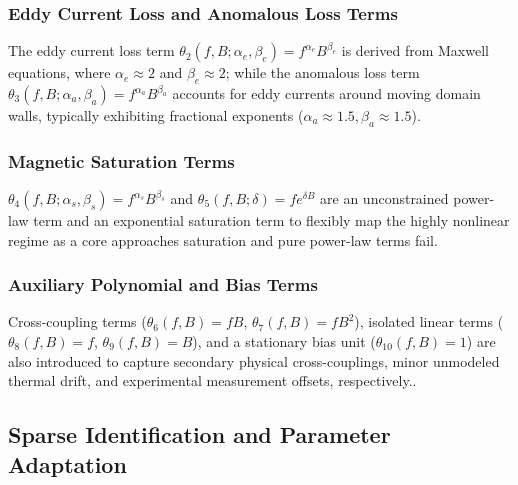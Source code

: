 \documentclass[lettersize,journal]{IEEEtran}
\begin{document}
\subsubsection{Eddy Current Loss and Anomalous Loss Terms}
The eddy current loss term $\theta_2 (f, B; \alpha_e, \beta_e) = f^{\alpha_e} B^{\beta_e}$ is derived from Maxwell equations, where $\alpha_e \approx 2$ and $\beta_e \approx 2$; while the anomalous loss term $\theta_3 (f, B; \alpha_a, \beta_a) = f^{\alpha_a} B^{\beta_a}$ accounts for eddy currents around moving domain walls, typically exhibiting fractional exponents ($\alpha_a \approx 1.5, \beta_a \approx 1.5$).

\subsubsection{Magnetic Saturation Terms}
$\theta_4 (f, B; \alpha_s, \beta_s) = f^{\alpha_s} B^{\beta_s}$ and $ \theta_5 (f, B; \delta)= f e^{\delta B}$ are an unconstrained power-law term and an exponential saturation term to flexibly map the highly nonlinear regime as a core approaches saturation and pure power-law terms fail. 

\subsubsection{Auxiliary Polynomial and Bias Terms}
Cross-coupling terms ($\theta_6 (f, B)=fB$, $\theta_7 (f, B)=fB^2$), isolated linear terms ($\theta_8(f, B)=f$, $\theta_9(f, B)=B$), and a stationary bias unit ($\theta_{10} (f, B)=1$) are also introduced to capture secondary physical cross-couplings, minor unmodeled thermal drift, and experimental measurement offsets, respectively..

\subsection{Sparse Identification and Parameter Adaptation}
\end{document}
